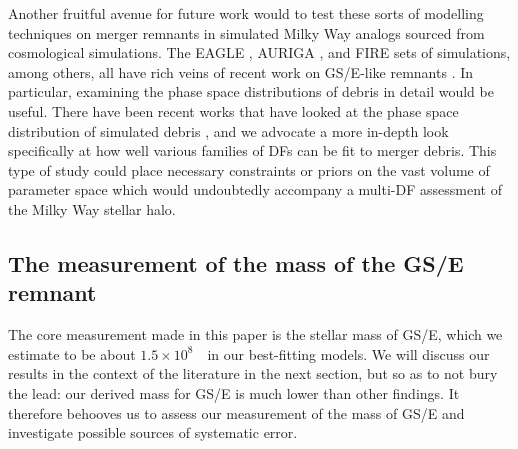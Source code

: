 Another fruitful avenue for future work would to test these sorts of modelling techniques on merger remnants in simulated Milky Way analogs sourced from cosmological simulations. The EAGLE \parencite{schaye15}, AURIGA \parencite{grand17}, and FIRE \parencite{wetzel16} sets of simulations, among others, all have rich veins of recent work on GS/E-like remnants \parencite[e.g.][]{fattahi19,mackereth19a,horta23b,orkney23}. In particular, examining the phase space distributions of debris in detail would be useful. There have been recent works that have looked at the phase space distribution of simulated debris \parencite[e.g.][]{amorisco17,jean-baptiste17,naidu21,amarante22,orkney23,carrillo23}, and we advocate a more in-depth look specifically at how well various families of DFs can be fit to merger debris. This type of study could place necessary constraints or priors on the vast volume of parameter space which would undoubtedly accompany a multi-DF assessment of the Milky Way stellar halo.

\subsection{The measurement of the mass of the GS/E remnant}

The core measurement made in this paper is the stellar mass of GS/E, which we estimate to be about $1.5\times10^{8}$~\Msun\ in our best-fitting models. We will discuss our results in the context of the literature in the next section, but so as to not bury the lead: our derived mass for GS/E is much lower than other findings. It therefore behooves us to assess our measurement of the mass of GS/E and investigate possible sources of systematic error.

